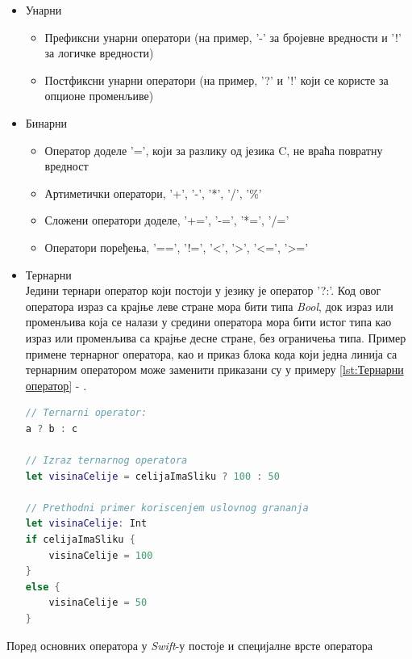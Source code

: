 \documentclass[12pt,oneside]{memoir}
\begin{document}
\begin{itemize}
  \item Унарни
  
\begin{itemize}
    \item Префиксни унарни оператори (на пример, '-' за бројевне вредности и '!' за логичке вредности)  
    \item Постфиксни унарни оператори (на пример, '?' и '!' који се користе за опционе променљиве)
\end{itemize}
  
  \item Бинарни 
  
\begin{itemize}
    \item Оператор доделе '=', који за разлику од језика C, не враћа повратну вредност  
    \item Артиметички оператори, '+', '-', '*', '/', '\%'
    \item Сложени оператори доделе, '+=', '-=', '*=', '/='
    \item Оператори поређења, '==', '!=', '<', '>', '<=', '>='
\end{itemize}
 
  \item Тернарни \\
  Једини тернари оператор који постоји у језику је оператор '?:'. Код овог оператора израз са крајње леве стране мора бити типа \textit{Bool}, док израз или променљива која се налази у средини оператора мора бити истог типа као израз или променљива са крајње десне стране, без ограничења типа. Пример примене тернарног оператора, као и приказ блока кода који једна линија са тернарним оператором може заменити приказани су у примеру \ref{lst:Тернарни оператор} - .
  
\begin{lstlisting}[caption=\textit{{Тернарни оператор}}, label={lst:Тернарни оператор}, language=Swift, frame=single]
// Ternarni operator:
a ? b : c

// Izraz ternarnog operatora 
let visinaCelije = celijaImaSliku ? 100 : 50

// Prethodni primer koriscenjem uslovnog grananja
let visinaCelije: Int
if celijaImaSliku {
    visinaCelije = 100
}
else {
    visinaCelije = 50
}
\end{lstlisting}
\end{itemize}

\indent Поред основних оператора у \textit{Swift}-у постоје и специјалне врсте оператора
\end{document}
